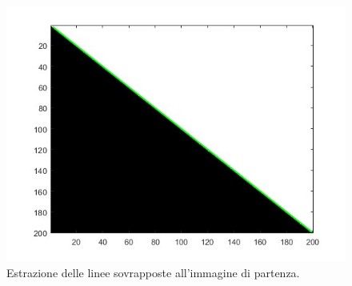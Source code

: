 \documentclass[a4paper]{article}
\begin{document}
	\begin{figure}[!htp]
		\centering
		\includegraphics[width=\textwidth]{img/lab/operato-locali-21.jpg}
		\caption{Estrazione delle linee sovrapposte all'immagine di partenza.}
	\end{figure}
\end{document}
